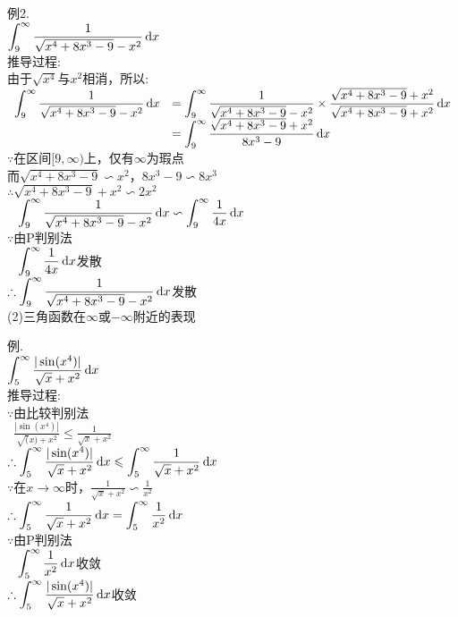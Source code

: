 例2.\\
$\displaystyle\int_9^{\infty}\frac{1}{\sqrt{x^4+8x^3-9}-x^2}\mathop{}\!\mathrm{d} x$\\
推导过程:\\
由于$\sqrt{x^4}$与$x^2$相消，所以:\\
$\begin{array}{>{\displaystyle}r >{\displaystyle}l}
\int_9^{\infty}\frac{1}{\sqrt{x^4+8x^3-9}-x^2}\dif x & =\int_9^{\infty}\frac{1}{\sqrt{x^4+8x^3-9}-x^2}\times\frac{\sqrt{x^4+8x^3-9}+x^2}{\sqrt{x^4+8x^3-9}+x^2}\dif x\\
& =\int_9^{\infty}\frac{\sqrt{x^4+8x^3-9}+x^2}{8x^3-9}\dif x
\end{array}$\\
$\because$在区间$[9,\infty)$上，仅有$\infty$为瑕点\\
\phantom{$\because$}而$\sqrt{x^4+8x^3-9}\backsim x^2$，$8x^3-9\backsim 8x^3$\\
$\therefore\sqrt{x^4+8x^3-9}+x^2\backsim 2x^2$\\
$\displaystyle\phantom{\therefore}\int_9^{\infty}\frac{1}{\sqrt{x^4+8x^3-9}-x^2}\mathop{}\!\mathrm{d} x\backsim\int_9^{\infty}\frac{1}{4x}\mathop{}\!\mathrm{d} x$\\
$\because$由P判别法\\
$\displaystyle\phantom{\because}\int_9^{\infty}\frac{1}{4x}\mathop{}\!\mathrm{d} x$发散\\
$\displaystyle\therefore\int_9^{\infty}\frac{1}{\sqrt{x^4+8x^3-9}-x^2}\mathop{}\!\mathrm{d} x$发散\\[2ex]

(2)三角函数在$\infty$或$-\infty$附近的表现\\
\begin{center}
\end{center}
例.\\
$\displaystyle\int_5^{\infty}\frac{|\sin(x^4)|}{\sqrt{x}+x^2}\mathop{}\!\mathrm{d} x$\\
推导过程:\\
$\because$由比较判别法\\
$\displaystyle\phantom{\because}\frac{|\sin(x^4)|}{\sqrt(x)+x^2}\leqslant\frac{1}{\sqrt{x}+x^2}$\\
$\displaystyle\therefore\int_5^{\infty}\frac{|\sin(x^4)|}{\sqrt{x}+x^2}\mathop{}\!\mathrm{d} x\leqslant\int_5^{\infty}\frac{1}{\sqrt{x}+x^2}\mathop{}\!\mathrm{d} x$\\
$\because$在$x\to\infty$时，$\displaystyle\frac{1}{\sqrt{x}+x^2}\backsim\frac{1}{x^2}$\\
$\displaystyle\therefore\int_5^{\infty}\frac{1}{\sqrt{x}+x^2}\mathop{}\!\mathrm{d} x=\int_5^{\infty}\frac{1}{x^2}\mathop{}\!\mathrm{d} x$\\
$\because$由P判别法\\
$\displaystyle\phantom{\because}\int_5^{\infty}\frac{1}{x^2}\mathop{}\!\mathrm{d} x$收敛\\
$\displaystyle\therefore\int_5^{\infty}\frac{|\sin(x^4)|}{\sqrt{x}+x^2}\mathop{}\!\mathrm{d} x$收敛\\[2ex]

